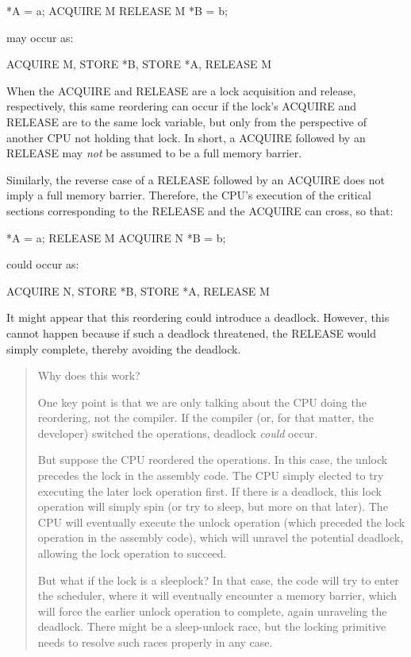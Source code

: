 \begin{VerbatimU}
	*A = a;
	ACQUIRE M
	RELEASE M
	*B = b;
\end{VerbatimU}

\noindent%
may occur as:

\begin{VerbatimU}
	ACQUIRE M, STORE *B, STORE *A, RELEASE M
\end{VerbatimU}

When the ACQUIRE and RELEASE are a lock acquisition and release,
respectively, this same reordering can occur if the lock's ACQUIRE and
RELEASE are to the same lock variable, but only from the perspective of
another CPU not holding that lock.
In short, a ACQUIRE followed by an RELEASE may \emph{not} be assumed to
be a full memory barrier.

Similarly, the reverse case of a RELEASE followed by an ACQUIRE does
not imply a full memory barrier.
Therefore, the CPU's execution of the critical sections corresponding
to the RELEASE and the ACQUIRE can cross, so that:

\begin{VerbatimU}
	*A = a;
	RELEASE M
	ACQUIRE N
	*B = b;
\end{VerbatimU}

\noindent%
could occur as:

\begin{VerbatimU}
	ACQUIRE N, STORE *B, STORE *A, RELEASE M
\end{VerbatimU}

It might appear that this reordering could introduce a deadlock.
However, this cannot happen because if such a deadlock threatened,
the RELEASE would simply complete, thereby avoiding the deadlock.

\begin{quote}
	Why does this work?

	One key point is that we are only talking about the CPU doing
	the reordering, not the compiler.
	If the compiler (or, for that matter, the developer) switched
	the operations, deadlock \emph{could} occur.

	But suppose the CPU reordered the operations.
	In this case, the unlock precedes the lock in the assembly code.
	The CPU simply elected to try executing the later lock operation
	first.
	If there is a deadlock, this lock operation will simply spin (or
	try to sleep, but more on that later).
	The CPU will eventually execute the unlock operation (which
	preceded the lock operation in the assembly code), which will
	unravel the potential deadlock, allowing the lock operation to
	succeed.

	But what if the lock is a sleeplock?
	In that case, the code will try to enter the scheduler, where it
	will eventually encounter a memory barrier, which will force the
	earlier unlock operation to complete, again unraveling the deadlock.
	There might be a sleep-unlock race, but the locking primitive
	needs to resolve such races properly in any case.

\end{quote}

